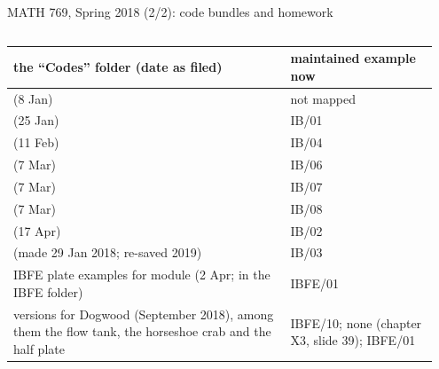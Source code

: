 \documentclass[aspectratio=169,11pt]{beamer}
\begin{document}
\begin{frame}{MATH 769, Spring 2018 (2/2): code bundles and homework}
\label{fr:m769f}
\begin{columns}[T,onlytextwidth]
\begin{column}{0.53\textwidth}
\tiny
\renewcommand{\arraystretch}{1.12}
\setlength{\tabcolsep}{3pt}
\begin{tabular}{@{}L{0.62\linewidth}L{0.33\linewidth}@{}}
\toprule
the ``Codes'' folder (date as filed) & maintained example now \\
\midrule
{} (8 Jan) & not mapped \\
 (25 Jan) & IB/01 \\
 (11 Feb) & IB/04 \\
 (7 Mar) & IB/06 \\
 (7 Mar) & IB/07 \\
 (7 Mar) & IB/08 \\
 (17 Apr) & IB/02 \\
 (made 29 Jan 2018; re-saved 2019) & IB/03 \\
IBFE plate examples for module  (2 Apr; in the IBFE folder) & IBFE/01 \\
 versions for Dogwood (September 2018), among them the flow tank, the horseshoe crab and the half plate & IBFE/10; none (chapter X3, slide 39); IBFE/01 \\
\bottomrule
\end{tabular}


\end{column}
\end{columns}
\end{frame}
\end{document}
